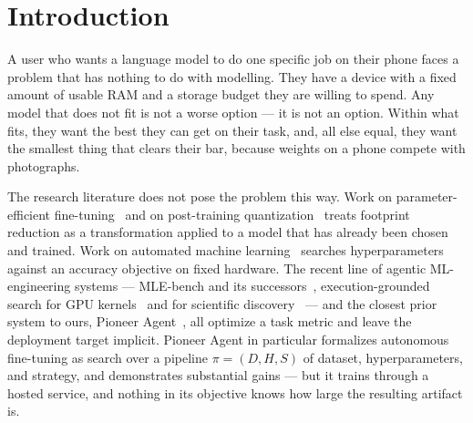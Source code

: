 \documentclass[sigconf,10pt]{acmart}
\begin{document}
\maketitle

\section{Introduction}
\label{sec:intro}

A user who wants a language model to do one specific job on their phone faces a problem
that has nothing to do with modelling. They have a device with a fixed amount of usable
RAM and a storage budget they are willing to spend. Any model that does not fit is not a
worse option --- it is not an option. Within what fits, they want the best they can get on
their task, and, all else equal, they want the smallest thing that clears their bar, because
weights on a phone compete with photographs.

The research literature does not pose the problem this way. Work on parameter-efficient
fine-tuning~\cite{hu2021lora,dettmers2023qlora} and on post-training
quantization~\cite{frantar2022gptq,lin2024awq,dettmers2022llmint8} treats footprint
reduction as a transformation applied to a model that has already been chosen and trained.
Work on automated machine learning~\cite{feurer2015autosklearn,thornton2013autoweka,
feurer2019automl} searches hyperparameters against an accuracy objective on fixed hardware.
The recent line of agentic ML-engineering systems --- MLE-bench and its
successors~\cite{chan2024mlebench,nam2025mlgym}, execution-grounded search for GPU
kernels~\cite{chen2026kernelagent} and for scientific discovery~\cite{yamada2025aiscientist,
gottweis2025coscientist} --- and the closest prior system to ours, Pioneer
Agent~\cite{atreja2026pioneer}, all optimize a task metric and leave the deployment target
implicit. Pioneer Agent in particular formalizes autonomous fine-tuning as search over a
pipeline $\pi = (D,H,S)$ of dataset, hyperparameters, and strategy, and demonstrates
substantial gains --- but it trains through a hosted service, and nothing in its objective
knows how large the resulting artifact is.
\end{document}
